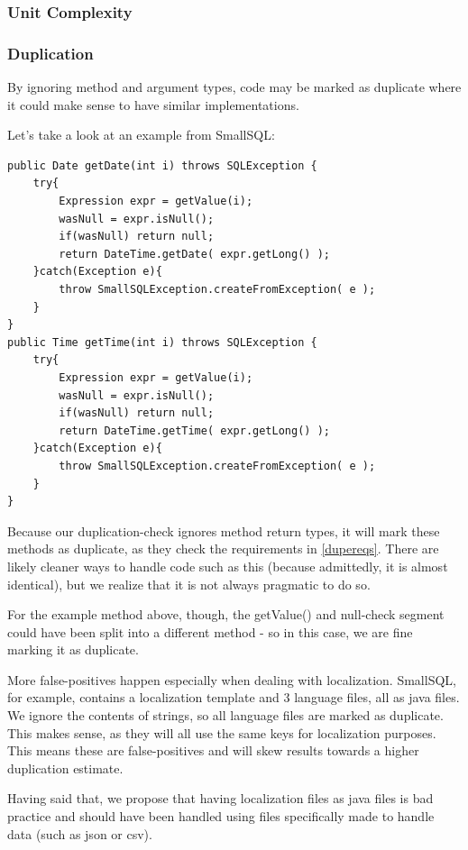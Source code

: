 \documentclass{article}
\begin{document}
\subsubsection{Unit Complexity}


\subsubsection{Duplication}
By ignoring method and argument types, code may be marked as duplicate where it could make sense to have similar implementations.

Let's take a look at an example from SmallSQL:

\begin{lstlisting}
public Date getDate(int i) throws SQLException {
    try{
		Expression expr = getValue(i);
        wasNull = expr.isNull();
		if(wasNull) return null;
		return DateTime.getDate( expr.getLong() );
    }catch(Exception e){
        throw SmallSQLException.createFromException( e );
    }
}
public Time getTime(int i) throws SQLException {
    try{
		Expression expr = getValue(i);
        wasNull = expr.isNull();
		if(wasNull) return null;
		return DateTime.getTime( expr.getLong() );
    }catch(Exception e){
        throw SmallSQLException.createFromException( e );
    }
}
\end{lstlisting}

Because our duplication-check ignores method return types, it will mark these methods as duplicate, as they check the requirements in \ref{dupereqs}. 
There are likely cleaner ways to handle code such as this (because admittedly, it is almost identical), but we realize that it is not always pragmatic to do so. 

For the example method above, though, the getValue() and null-check segment could have been split into a different method - so in this case, we are fine marking it as duplicate.

More false-positives happen especially when dealing with localization. SmallSQL, for example, contains a localization template and 3 language files, all as java files. We ignore the contents of strings, so all language files are marked as duplicate. This makes sense, as they will all use the same keys for localization purposes. This means these are false-positives and will skew results towards a higher duplication estimate.

Having said that, we propose that having localization files as java files is bad practice and should have been handled using files specifically made to handle data (such as json or csv).
\end{document}

